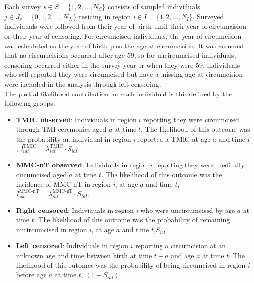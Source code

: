 \documentclass{article}
\begin{document}
\begin{appendix}
\noindent Each survey  $s \in S = \{1, 2, \ldots, N_S\}$ consists of sampled individuals $j \in J_s = \{0, 1, 2, \ldots, N_{J_s}\}$ residing in region $i \in I = \{1, 2, \ldots, N_I\}$. Surveyed individuals were followed from their year of birth until their year of circumcision or their year of censoring. For circumcised individuals, the year of circumcision was calculated as the year of birth plus the age at circumcision. It was assumed that no circumcisions occurred after age 59, so for uncircumcised individuals, censoring occurred either in the survey year or when they were 59. Individuals who self-reported they were circumcised but have a missing age at circumcision were included in the analysis through left censoring. \\

\noindent The partial likelihood contribution for each individual is this defined by the following groups:
\begin{itemize}
	\item \textbf{TMIC observed}: Individuals in region $i$ reporting they were circumcised through TMI ceremonies aged $a$ at time $t$. The likelihood of this outcome was the probability an individual in region $i$ reported a TMIC at age $a$ and time $t$, $I^{\text{TMIC}}_{iat} = \lambda^{\text{TMIC}}_{iat}\cdot S_{iat}$. 
	\item \textbf{MMC-nT observed}: Individuals in region $i$ reporting they were medically circumcised aged $a$ at time $t$. The likelihood of this outcome was the incidence of MMC-nT in region $i$, at age $a$ and time $t$, $I^{\text{MMC-nT}}_{iat} = \lambda^{\text{MMC-nT}}_{iat}\cdot S_{iat}$. 
	\item \textbf{Right censored}: Individuals in region $i$ who were uncircumcised by age $a$ at time $t$.  The likelihood of this outcome was the probability of remaining uncircumcised in region $i$, at age $a$ and time $t$,$S_{iat}$
	\item \textbf{Left censored}: Individuals in region $i$ reporting a circumcision at an unknown age and time between birth at time $t-a$ and age $a$ at time $t$. The likelihood of this outomce was the probability of being circumcised in region $i$ before age $a$ at time $t$, $(1-S_{iat})$ 
\end{itemize}


\end{appendix}
\end{document}

